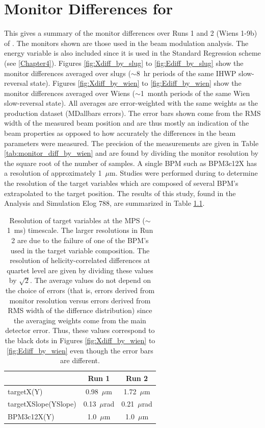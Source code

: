 
\chapter{Monitor Differences for \Qs} 
\captionsetup{justification=justified,singlelinecheck=false}

\label{AppendixB} 

This gives a summary of the monitor differences over Runs 1 and 2 (Wiens 1-9b) of \Q. The monitors shown are those used in the beam modulation analysis. The \Qs energy variable is also included since it is used in the Standard Regression scheme (see \ref{Chapter4}). Figures \ref{fig:Xdiff_by_slug} to \ref{fig:Ediff_by_slug} show the monitor differences averaged over slugs ($\sim$8~hr periods of the same IHWP slow-reversal state). Figures \ref{fig:Xdiff_by_wien} to \ref{fig:Ediff_by_wien} show the monitor differences averaged over Wiens ($\sim$1~month periods of the same Wien slow-reversal state). All averages are error-weighted with the same weights as the production dataset (MDallbars errors). The error bars shown come from the RMS width of the measured beam position and are thus mostly an indication of the beam properties as opposed to how accurately the differences in the beam parameters were measured. The precision of the measurements are given in Table \ref{tab:monitor_diff_by_wien} and are found by dividing the monitor resolution by the square root of the number of samples. A single BPM such as BPM3c12X has a resolution of approximately 1~$\mu$m. Studies were performed during \Qs to determine the resolution of the target variables which are composed of several BPM's extrapolated to the target position. The results of this study, found in the \Qs Analysis and Simulation Elog 788, are summarized in Table \ref{tab:res_mon}.
\begin{table}[h]
\begin{center}
\caption{\label{tab:res_mon}Resolution of target variables at the MPS ($\sim$1~ms) timescale. The larger resolutions in Run 2 are due to the failure of one of the BPM's used in the target variable composition. The resolution of helicity-correlated differences at quartet level are given by dividing these values by $\sqrt{2}$. The average values do not depend on the choice of errors (that is, errors derived from monitor resolution versus errors derived from RMS width of the differnce distribution) since the averaging weights come from the main detector error. Thus, these values correspond to the black dots in Figures \ref{fig:Xdiff_by_wien} to \ref{fig:Ediff_by_wien} even though the error bars are different.}
\begin{tabular}{lcc}\\\hline
~&Run 1&Run 2\\\hline\hline
targetX(Y)&0.98~$\mu$m&1.72~$\mu$m\\
targetXSlope(YSlope)&0.13~$\mu$rad&0.21~$\mu$rad\\
BPM3c12X(Y)&1.0~$\mu$m&1.0~$\mu$m\\\hline
\end{tabular}
\end{center}
\end{table}

